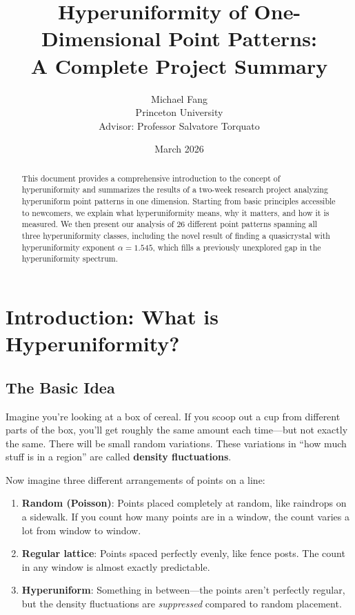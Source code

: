 \documentclass[11pt,letterpaper]{article}
\title{\textbf{Hyperuniformity of One-Dimensional Point Patterns:\\A Complete Project Summary}}
\author{Michael Fang\\Princeton University\\Advisor: Professor Salvatore Torquato}
\date{March 2026}
\begin{document}
\maketitle

\begin{abstract}
This document provides a comprehensive introduction to the concept of hyperuniformity and summarizes the results of a two-week research project analyzing hyperuniform point patterns in one dimension. Starting from basic principles accessible to newcomers, we explain what hyperuniformity means, why it matters, and how it is measured. We then present our analysis of 26 different point patterns spanning all three hyperuniformity classes, including the novel result of finding a quasicrystal with hyperuniformity exponent $\alpha = 1.545$, which fills a previously unexplored gap in the hyperuniformity spectrum.
\end{abstract}

\tableofcontents
\newpage

\section{Introduction: What is Hyperuniformity?}

\subsection{The Basic Idea}

Imagine you're looking at a box of cereal. If you scoop out a cup from different parts of the box, you'll get roughly the same amount each time---but not exactly the same. There will be small random variations. These variations in ``how much stuff is in a region'' are called \textbf{density fluctuations}.

Now imagine three different arrangements of points on a line:

\begin{enumerate}
    \item \textbf{Random (Poisson)}: Points placed completely at random, like raindrops on a sidewalk. If you count how many points are in a window, the count varies a lot from window to window.

    \item \textbf{Regular lattice}: Points spaced perfectly evenly, like fence posts. The count in any window is almost exactly predictable.

    \item \textbf{Hyperuniform}: Something in between---the points aren't perfectly regular, but the density fluctuations are \textit{suppressed} compared to random placement.
\end{enumerate}
\end{document}
